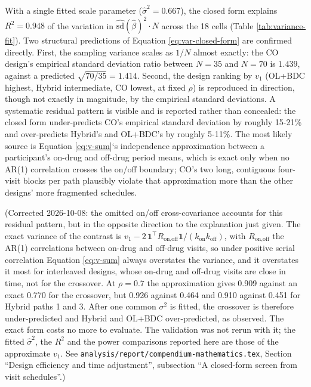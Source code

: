 \documentclass[
  11pt,
]{article}
\begin{document}
With a single fitted scale parameter (\(\hat\sigma^2 =
0.667\)), the
closed form explains \(R^2 = 0.948\) of the variation in
\(\widehat{\mathrm{sd}}(\hat\beta)^2 \cdot N\) across the
18 cells
(Table \ref{tab:variance-fit}). Two structural predictions of
Equation \eqref{eq:var-closed-form} are confirmed directly. First,
the sampling variance scales as \(1/N\) almost exactly: the CO
design's empirical standard deviation ratio between \(N=35\) and
\(N=70\) is \(1.439\), against a predicted
\(\sqrt{70/35}=1.414\). Second, the design ranking by
\(v_1\) (OL+BDC highest, Hybrid intermediate, CO lowest, at fixed
\(\rho\)) is reproduced in direction, though not exactly in
magnitude, by the empirical standard deviations. A systematic
residual pattern is visible and is reported rather than concealed:
the closed form under-predicts CO's empirical standard deviation by
roughly 15-21\% and over-predicts Hybrid's and OL+BDC's by
roughly 5-11\%. The most likely source is Equation
\eqref{eq:v-sum}`s
independence approximation between a participant's on-drug and
off-drug period means, which is exact only when no AR(1) correlation
crosses the on/off boundary; CO's two long, contiguous four-visit
blocks per path plausibly violate that approximation more than the
other designs' more fragmented schedules.

(Corrected 2026-10-08: the omitted on/off cross-covariance accounts for
this residual pattern, but in the opposite direction to the
explanation just given. The exact variance of the contrast is
\(v_1 - 2\,\mathbf 1^\top R_{\text{on,off}}\mathbf 1/(k_{\text{on}}
k_{\text{off}})\), with \(R_{\text{on,off}}\) the AR(1) correlations
between on-drug and off-drug visits, so under positive serial
correlation Equation \eqref{eq:v-sum} always overstates the variance,
and it overstates it most for interleaved designs, whose on-drug and
off-drug visits are close in time, not for the crossover. At
\(\rho = 0.7\) the approximation gives 0.909 against an exact 0.770 for
the crossover, but 0.926 against 0.464 and 0.910 against 0.451 for
Hybrid paths 1 and 3. After one common \(\sigma^2\) is fitted, the
crossover is therefore under-predicted and Hybrid and OL+BDC
over-predicted, as observed. The exact form costs no more to evaluate.
The validation was not rerun with it; the fitted \(\hat\sigma^2\), the
\(R^2\) and the power comparisons reported here are those of the
approximate \(v_1\). See \texttt{analysis/report/compendium-mathematics.tex},
Section ``Design efficiency and time adjustment'', subsection ``A
closed-form screen from visit schedules''.)
\end{document}
